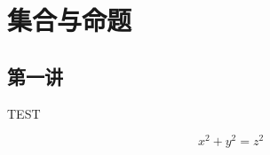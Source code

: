 \documentclass[a4paper,11pt]{article}
\begin{document}
	\section{集合与命题}
	
	\subsection{第一讲}
	
	TEST
	
	$$x^2+y^2=z^2$$
	
\end{document}
